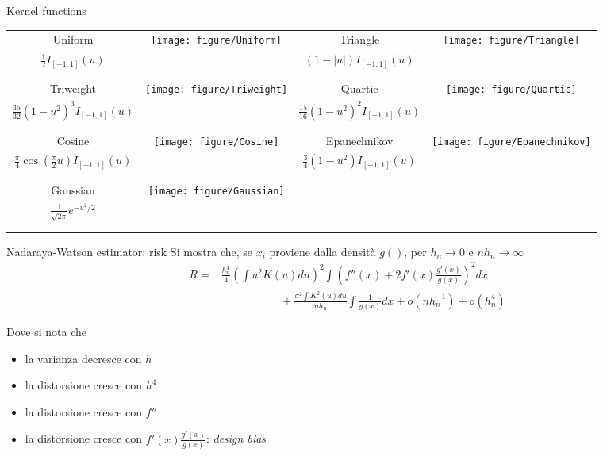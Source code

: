 \documentclass{beamer}
\begin{document}
\begin{frame}{Kernel functions}

\begin{tabular}{cccc}
Uniform &
\multirow{4}{*}{
\texttt{[image: figure/Uniform]} 
}%
& 
Triangle &
\multirow{4}{*}{
\texttt{[image: figure/Triangle]} 
}%
\\
$\frac{1}{2}I_{[-1,1]}(u)$ & &  $(1-|u|)I_{[-1,1]}(u)$ & \\ & & & \\ & & & \\
Triweight &
\multirow{4}{*}{
\texttt{[image: figure/Triweight]} 
}%
& 
Quartic &
\multirow{4}{*}{
\texttt{[image: figure/Quartic]} 
}%
\\
 $\frac{35}{32}(1-u^2)^3I_{[-1,1]}(u)$ & &   $\frac{15}{16}(1-u^2)^2I_{[-1,1]}(u)$ & \\ & & & \\ & & & \\
Cosine &
\multirow{4}{*}{
\texttt{[image: figure/Cosine]} 
}%
& 
Epanechnikov &
\multirow{4}{*}{
\texttt{[image: figure/Epanechnikov]} 
}%
\\
$\frac{\pi}{4}\cos\left(\frac{\pi}{2}u\right)I_{[-1,1]}(u)$ & &    $\frac{3}{4}(1-u^2)I_{[-1,1]}(u)$  & \\ & & & \\ & & & \\
Gaussian &
\multirow{4}{*}{
\texttt{[image: figure/Gaussian]} 
}%
& 
 &
\multirow{4}{*}{}%
\\
$\frac{1}{\sqrt{2\pi}} e^{-u^2/2}$ & &      & \\ & & & \\ & & & \\

\end{tabular}
\end{frame}


\begin{frame}{Nadaraya-Watson estimator: risk}
Si mostra che, se $x_i$ proviene dalla densit\`a $g()$, per $h_n\rightarrow 0$ e $nh_n\rightarrow\infty$
\begin{align*}
R = &\frac{h_n^4}{4}\left(\int u^2K(u)du\right)^2\int \left(f''(x)+2f'(x)\frac{g'(x)}{g(x)}\right)^2dx \\
&\phantom{====}+ \frac{\sigma^2\int K^2(u)du}{nh_n}\int\frac{1}{g(x)}dx +o(nh_n^{-1}) +o(h_n^4)
\end{align*}

Dove si nota che
\begin{itemize}
\item la varianza decresce con $h$
\item la distorsione cresce con $h^4$
\item la distorsione cresce con  $f''$
\item la distorsione cresce con  $f'(x)\frac{g'(x)}{g(x)}$: {\it design bias}
\end{itemize}
\end{frame}
\end{document}
